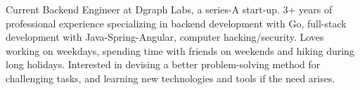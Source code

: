 

\begin{cvparagraph}

Current Backend Engineer at Dgraph Labs, a series-A start-up. 3+ years of professional experience specializing in backend development with Go, full-stack development with Java-Spring-Angular, computer hacking/security. Loves working on weekdays, spending time with friends on weekends and hiking during long holidays. Interested in devising a better problem-solving method for challenging tasks, and learning new technologies and tools if the need arises.
\end{cvparagraph}
